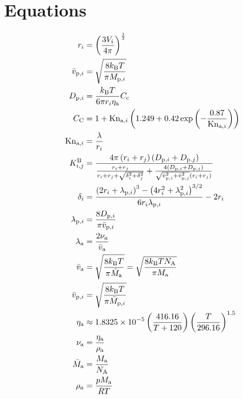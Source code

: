 \documentclass{article}
\begin{document}
\section{Equations}
\label{sec:equations}

\begin{align}
r_i & = \left(\frac{3V_i}{4\pi}\right)^{\frac{1}{3}} \label{eq:particleradius} \\
\bar{v}_{\textrm{p},i} & = \sqrt{ \frac{8 k_{\textrm{B}}T}{\pi M_{\textrm{p},i}}} \label{eq:particlespeed} \\
D_{\textrm{p},i} & = \frac{k_{\textrm{B}}T}{6 \pi r_i \eta_{\textrm{a}}} C_{\rm c}  \label{eq:diff}\\
C_{\textrm{C}}  & = 1 + \mathrm{Kn}_{\textrm{a},i} \left(1.249 + 0.42 \exp \left(-\frac{0.87}{\mathrm{Kn}_{\textrm{a},i} }\right)\right) \label{eq:cc}\\
\mathrm{Kn}_{\textrm{a},i} & = \frac{\lambda}{r_i}   \label{eq:knudsen}\\
K_{i,j}^{\rm B} & = \frac{4\pi\left(r_i + r_j \right)\left(D_{\textrm{p},i} + D_{\textrm{p}.j}\right)}
{  \frac{r_i + r_j}{r_i + r_j + \sqrt{\delta_i^2 + \delta_j^2}}
+ \frac{4\left(D_{\textrm{p},i} + D_{\textrm{p},j}\right) } { \sqrt{\bar{v}_{\textrm{p},i}^2 + \bar{v}_{\textrm{p},j}^2} \left(r_i + r_j\right)}}
\label{eq:bckernel} \\
\delta_i & = \frac{\left(2r_i + \lambda_{\textrm{p},i}\right)^3 - \left(4r_i^2 +\lambda_{\textrm{p},i}^2 \right)^{3/2}}{6 r_i \lambda_{\textrm{p},i}} - 2 r_i \label{eq:delta}\\
\lambda_{\textrm{p},i} & = \frac{8 D_{\textrm{p},i}}{\pi \bar{v}_{\textrm{p},i}} \label{eq:particlemfp}\\
\lambda_{\rm a} & = \frac{2 \nu_a}{\bar{v}_{\rm a}} \label{eq:mfp}\\
\bar{v}_{\rm a} & = \sqrt{ \frac{8 k_{\textrm{B}}T }{\pi \bar{M}_{\rm a}}}  =  \sqrt{ \frac{8 k_{\textrm{B}}T N_{\rm A}}{\pi M_{\rm a}}} \\
\bar{v}_{\textrm{p},i} & = \sqrt{ \frac{8 k_{\textrm{B}}T }{\pi \bar{M}_{\textrm{p}, i}}} \\
\eta_{\rm a} & \approx 1.8325 \times 10^{-5} \left(\frac{416.16}{T + 120}\right) \left(\frac{T}{296.16}\right)^{1.5} \label{eq:viscod}\\
\nu_{\rm a} & = \frac{\eta_{\rm a}}{\rho_{\rm a}} \label{eq:viscok}\\
\bar{M}_{\rm a} & = \frac{M_{\rm a} }{N_{\rm A}} \label{eq:molecule_mass} \\
\rho_a & = \frac{pM_{\rm a}}{RT} \label{eq:rhoair}
\end{align}
\end{document}
